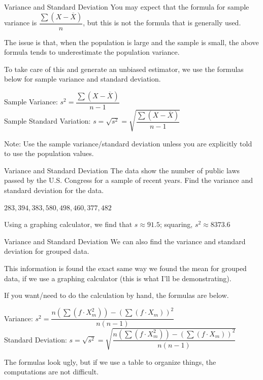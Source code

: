 \documentclass[t, aspectratio=169]{beamer}
\newcommand{\fp}[1]{\left({#1}\right)} %
\newcommand{\?}{\stackrel{?}{=}}
\begin{document}
	\begin{frame}{Variance and Standard Deviation}
		You may expect that the formula for sample variance is $\dfrac{\sum (X - \overline{X})}{n}$, but this is not the formula that is generally used. \pause
		
		The issue is that, when the population is large and the sample is small, the above formula tends to underestimate the population variance. \pause
		
		To take care of this and generate an unbiased estimator, we use the formulas below for sample variance and standard deviation. \pause
		
		Sample Variance: $s^2 = \dfrac{\sum (X - \overline{X})}{n-1}$ \\
		Sample Standard Variation: $s = \sqrt{s^2} = \sqrt{\dfrac{\sum (X - \overline{X})}{n-1}}$ \pause
		
		Note: Use the sample variance/standard deviation unless you are explicitly told to use the population values.
	\end{frame}

	\begin{frame}{Variance and Standard Deviation}
		The data show the number of public laws passed by the U.S. Congress for a sample of recent years. Find the variance and standard deviation for the data.
		
		$283, 394, 383, 580, 498, 460, 377, 482$ \pause \vspace{32pt}
		
		Using a graphing calculator, we find that $s \approx 91.5$; squaring, $s^2 \approx 8373.6$
	\end{frame}

	\begin{frame}{Variance and Standard Deviation}
		We can also find the variance and standard deviation for grouped data.
		
		This information is found the exact same way we found the mean for grouped data, if we use a graphing calculator (this is what I'll be demonstrating). \pause
		
		If you want/need to do the calculation by hand, the formulas are below.
		
		Variance: $s^2 = \dfrac{n\fp{\sum (f \cdot X_m^2)} - (\sum (f \cdot X_m))^2}{n(n-1)}$ \\
		Standard Deviation: $s = \sqrt{s^2} = \sqrt{\dfrac{n\fp{\sum (f \cdot X_m^2)} - (\sum (f \cdot X_m))^2}{n(n-1)}}$ \pause
		
		The formulas look ugly, but if we use a table to organize things, the computations are not difficult.
	\end{frame}
\end{document}
